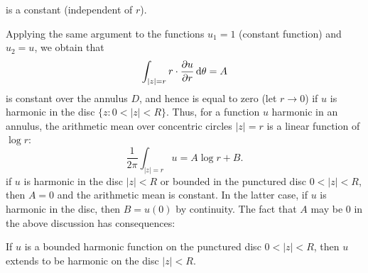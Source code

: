 is a constant (independent of $r$).\par
Applying the same argument to the functions $u_1=1$ (constant function) and $u_2=u$, we obtain that
\[\int_{|z|=r}r\cdot\frac{\partial u}{\partial r}\mathop{}\!\mathrm{d}\theta=A\]
is constant over the annulus $D$, and hence is equal to zero (let $r\to 0$) if $u$ is harmonic in the disc $\{z:0<|z|<R\}$. Thus, for a function $u$ harmonic in an annulus, the arithmetic mean over concentric circles $|z|=r$ is a linear function of $\log r$:
\[\frac{1}{2\pi}\int_{|z|=r}u=A\log r+B.\]
if $u$ is harmonic in the disc $|z|<R$ or bounded in the punctured disc $0<|z|<R$, then $A=0$ and the arithmetic mean is constant. In the latter case, if $u$ is harmonic in the disc, then $B=u(0)$ by continuity. The fact that $A$ may be $0$ in the above discussion has consequences:
\begin{proposition}
If $u$ is a bounded harmonic function on the punctured disc $0<|z|<R$, then $u$ extends to be harmonic on the disc $|z|<R$.
\end{proposition}
